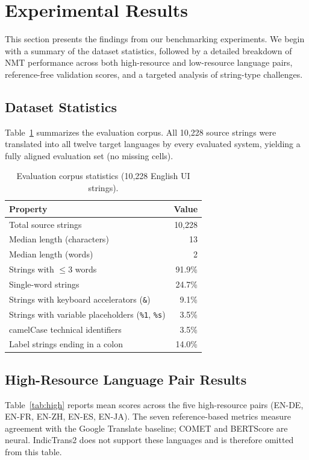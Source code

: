 \documentclass[pdflatex,sn-mathphys-num]{sn-jnl}
\begin{document}
\section{Experimental Results}

This section presents the findings from our benchmarking experiments. We begin with a summary of the dataset statistics, followed by a detailed breakdown of NMT performance across both high-resource and low-resource language pairs, reference-free validation scores, and a targeted analysis of string-type challenges.

\subsection{Dataset Statistics}

Table~\ref{tab:corpusstats} summarizes the evaluation corpus. All 10,228 source strings were translated into all twelve target languages by every evaluated system, yielding a fully aligned evaluation set (no missing cells).

\begin{table}[h]
\centering
\caption{Evaluation corpus statistics (10,228 English UI strings).}\label{tab:corpusstats}
\begin{tabular}{@{}lr@{}}
\toprule
Property & Value \\
\midrule
Total source strings & 10,228 \\
Median length (characters) & 13 \\
Median length (words) & 2 \\
Strings with $\leq$3 words & 91.9\% \\
Single-word strings & 24.7\% \\
Strings with keyboard accelerators (\texttt{\&}) & 9.1\% \\
Strings with variable placeholders (\texttt{\%1}, \texttt{\%s}) & 3.5\% \\
camelCase technical identifiers & 3.5\% \\
Label strings ending in a colon & 14.0\% \\
\bottomrule
\end{tabular}
\end{table}

\subsection{High-Resource Language Pair Results}

Table~\ref{tab:high} reports mean scores across the five high-resource pairs (EN-DE, EN-FR, EN-ZH, EN-ES, EN-JA). The seven reference-based metrics measure agreement with the Google Translate baseline; COMET and BERTScore are neural. IndicTrans2 does not support these languages and is therefore omitted from this table.
\end{document}
